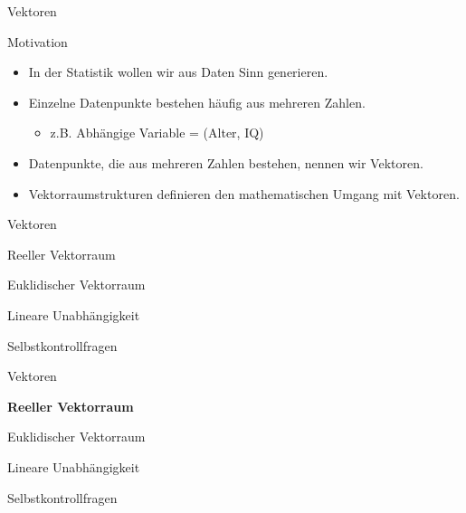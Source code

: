 \documentclass[
  8pt,
  ignorenonframetext,
]{beamer}
\providecommand{\tightlist}{%
  \setlength{\itemsep}{0pt}\setlength{\parskip}{0pt}}
\begin{document}
\begin{frame}{Vektoren}
\protect\hypertarget{vektoren}{}
\vspace{3mm}

Motivation

\begin{itemize}
\tightlist
\item
  In der Statistik wollen wir aus Daten Sinn generieren.
\item
  Einzelne Datenpunkte bestehen häufig aus mehreren Zahlen.

  \begin{itemize}
  \tightlist
  \item
    z.B. Abhängige Variable = (Alter, IQ)
  \end{itemize}
\item
  Datenpunkte, die aus mehreren Zahlen bestehen, nennen wir Vektoren.
\item
  Vektorraumstrukturen definieren den mathematischen Umgang mit
  Vektoren.
\end{itemize}
\end{frame}

\begin{frame}{Vektoren}
\protect\hypertarget{vektoren-1}{}
\vfill
{}
\Large

Reeller Vektorraum

Euklidischer Vektorraum

Lineare Unabhängigkeit

Selbstkontrollfragen
\end{frame}

\begin{frame}{Vektoren}
\protect\hypertarget{vektoren-2}{}
\vfill
{}
\Large

\textbf{Reeller Vektorraum}

Euklidischer Vektorraum

Lineare Unabhängigkeit

Selbstkontrollfragen
\end{frame}
\end{document}
